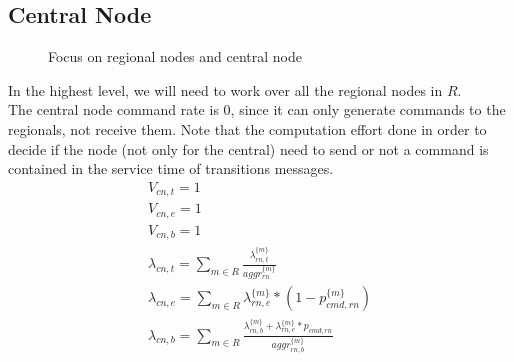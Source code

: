 \documentclass[11pt]{article}
\begin{document}
\subsection{Central Node}
\begin{figure}[H]
	\centering
	\hspace*{-3.7cm}
	\frame{}
	\caption{Focus on regional nodes and central node}
\end{figure}
In the highest level, we will need to work over all the regional nodes in $R$.\\
The central node command rate is 0, since it can only generate commands to the regionals, not receive them. Note that the computation effort done in order to decide if the node (not only for the central) need to send or not a command is contained in the service time of transitions messages.
\begin{equation}
	\begin{array}{l}
		V_{cn, t} = 1 \\
		V_{cn, e} = 1 \\ %
		V_{cn, b} = 1 \\
        \lambda_{cn, t} = \sum\limits_{m \in R}{ \frac{\lambda^{\{m\}}_{rn, t}}{aggr^{\{ m \}}_{rn}}}  \\
        \lambda_{cn, e} = \sum\limits_{m \in R}{\lambda^{\{m\}}_{rn, e} * (1-p^{\{ m \}}_{cmd,rn})} \\
		\lambda_{cn,b}=\sum\limits_{m \in R}\frac{\lambda_{rn,b}^{\{m\}}+\lambda_{rn,e}^{\{m\}}*p_{cmd,rn}}{aggr^{\{ m \}}_{rn,b}}\\
	\end{array}
\end{equation}
\end{document}
